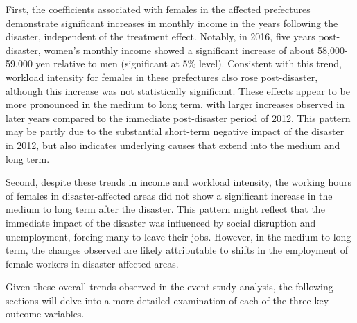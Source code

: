 \documentclass[a4paper,12pt]{article}
\begin{document}
First, the coefficients associated with females in the affected prefectures demonstrate significant increases in monthly income in the years following the disaster, independent of the treatment effect. Notably, in 2016, five years post-disaster, women's monthly income showed a significant increase of about 58,000-59,000 yen relative to men (significant at 5\% level). Consistent with this trend, workload intensity for females in these prefectures also rose post-disaster, although this increase was not statistically significant. These effects appear to be more pronounced in the medium to long term, with larger increases observed in later years compared to the immediate post-disaster period of 2012. This pattern may be partly due to the substantial short-term negative impact of the disaster in 2012, but also indicates underlying causes that extend into the medium and long term.

Second, despite these trends in income and workload intensity, the working hours of females in disaster-affected areas did not show a significant increase in the medium to long term after the disaster. This pattern might reflect that the immediate impact of the disaster was influenced by social disruption and unemployment, forcing many to leave their jobs. However, in the medium to long term, the changes observed are likely attributable to shifts in the employment of female workers in disaster-affected areas.


Given these overall trends observed in the event study analysis, the following sections will delve into a more detailed examination of each of the three key outcome variables.







\end{document}
